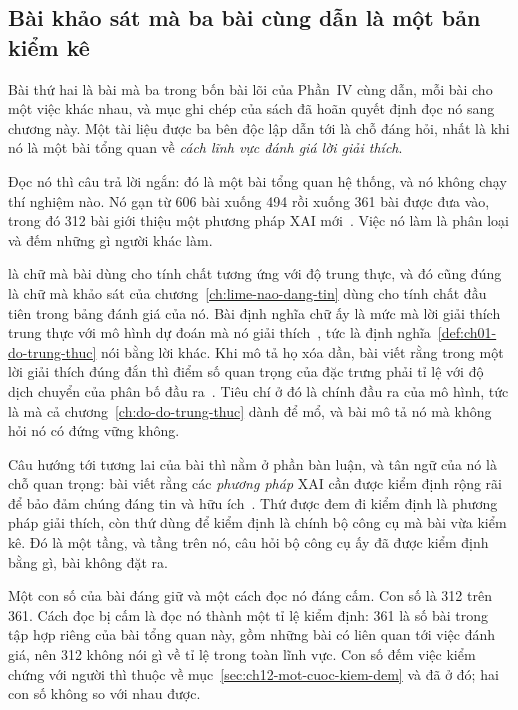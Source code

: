 \subsection*{Bài khảo sát mà ba bài cùng dẫn là một bản kiểm kê}

%
Bài thứ hai là bài mà ba trong bốn bài lõi của Phần~IV cùng dẫn, mỗi bài cho một việc
khác nhau, và mục ghi chép của sách đã hoãn quyết định đọc nó sang chương này.
Một tài liệu được ba bên độc lập dẫn tới là chỗ đáng hỏi, nhất là khi nó là một
bài tổng quan về \emph{cách lĩnh vực đánh giá lời giải thích}.

Đọc nó thì câu trả lời ngắn: đó là một bài tổng quan hệ thống, và nó không chạy
thí nghiệm nào. Nó gạn từ 606 bài xuống 494 rồi xuống 361 bài được đưa vào, trong
đó 312 bài giới thiệu một phương pháp XAI mới~\autocite{mnauta}. Việc nó làm là
phân loại và đếm những gì người khác làm.

%
 là chữ mà bài dùng cho tính chất tương ứng với độ trung thực,
và đó cũng đúng là chữ mà khảo sát của chương~\ref{ch:lime-nao-dang-tin} dùng cho
tính chất đầu tiên trong bảng đánh giá của nó. Bài định nghĩa chữ ấy là mức mà
lời giải thích trung thực với mô hình dự đoán mà nó giải
thích~\autocite{mnauta}, tức là định nghĩa~\ref{def:ch01-do-trung-thuc} nói bằng
lời khác. Khi mô tả họ xóa dần, bài
viết rằng trong một lời giải thích đúng đắn thì điểm số quan trọng của đặc trưng
phải tỉ lệ với độ dịch chuyển của phân bố đầu ra~\autocite{mnauta}. Tiêu chí ở
đó là chính đầu ra của mô hình, tức là  mà cả
chương~\ref{ch:do-do-trung-thuc} dành để mổ, và bài mô tả nó mà không hỏi nó có
đứng vững không.

Câu hướng tới tương lai của bài thì nằm ở phần bàn luận, và tân ngữ của nó là chỗ
quan trọng: bài viết rằng các \emph{phương pháp} XAI cần được kiểm định rộng rãi
để bảo đảm chúng đáng tin và hữu ích~\autocite{mnauta}. Thứ được đem đi kiểm định
là phương pháp giải thích, còn thứ dùng để kiểm định là chính bộ công cụ mà bài
vừa kiểm kê. Đó là một tầng, và tầng trên nó, câu hỏi bộ công cụ ấy đã được kiểm
định bằng gì, bài không đặt ra.

Một con số của bài đáng giữ và một cách đọc nó đáng cấm. Con số là 312 trên 361.
Cách đọc bị cấm là đọc nó thành một tỉ lệ kiểm định: 361 là số bài trong tập hợp
riêng của bài tổng quan này, gồm những bài có liên quan tới việc đánh giá, nên
312 không nói gì về tỉ lệ trong toàn lĩnh vực. Con số đếm việc kiểm chứng với
người thì thuộc về mục~\ref{sec:ch12-mot-cuoc-kiem-dem} và đã ở đó; hai con số
không so với nhau được.

